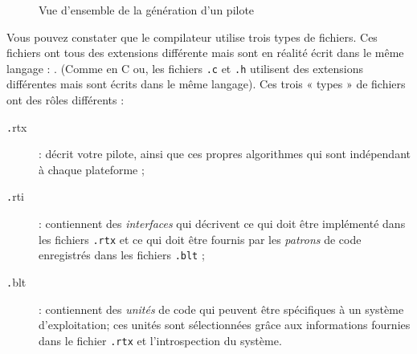 \documentclass[francais]{rtxarticle}
\begin{document}
\begin{figure}[ht!]
\begin{center}
\caption{Vue d'ensemble de la génération d'un pilote}
\end{center}
\end{figure}

Vous pouvez constater que le compilateur utilise trois types de fichiers. Ces
fichiers ont tous des extensions différente mais sont en réalité écrit dans le
même langage : \rtx. (Comme en C ou, les fichiers \texttt{.c} et \texttt{.h}
utilisent des extensions différentes mais sont écrits dans le même
langage). Ces trois « types » de fichiers ont des rôles différents :
\begin{description}
\item [{\texttt .rtx}] : décrit votre pilote, ainsi que ces propres algorithmes
qui sont indépendant à chaque plateforme ;
\item [{\texttt .rti}] : contiennent des \emph{interfaces} qui décrivent ce qui
doit être implémenté dans les fichiers \texttt{.rtx} et ce qui doit être fournis
par les \emph{patrons} de code enregistrés dans les fichiers \texttt{.blt} ;
\item [{\texttt .blt}] : contiennent des \emph{unités} de code qui peuvent être
spécifiques à un système d'exploitation; ces unités sont sélectionnées grâce aux
informations fournies dans le fichier \texttt{.rtx} et l'introspection du
système.
\end{description}
\end{document}
